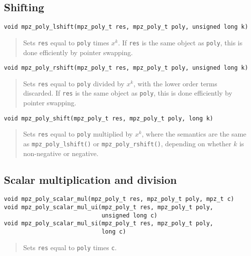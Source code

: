 \documentclass[a4paper,10pt]{article}
\newcommand{\code}{\lstinline}
\begin{document}
\subsection{Shifting}

\begin{lstlisting}
void mpz_poly_lshift(mpz_poly_t res, mpz_poly_t poly, unsigned long k)
\end{lstlisting}
\begin{quote}
Sets \code{res} equal to \code{poly} times $x^k$. If \code{res} is the same object as \code{poly}, this is done efficiently by pointer swapping.
\end{quote}

\begin{lstlisting}
void mpz_poly_rshift(mpz_poly_t res, mpz_poly_t poly, unsigned long k)
\end{lstlisting}
\begin{quote}
Sets \code{res} equal to \code{poly} divided by $x^k$, with the lower order terms discarded. If \code{res} is the same object as \code{poly}, this is done efficiently by pointer swapping.
\end{quote}

\begin{lstlisting}
void mpz_poly_shift(mpz_poly_t res, mpz_poly_t poly, long k)
\end{lstlisting}
\begin{quote}
Sets \code{res} equal to \code{poly} multiplied by $x^k$, where the semantics are the same as \code{mpz_poly_lshift()} or \code{mpz_poly_rshift()}, depending on whether $k$ is non-negative or negative.
\end{quote}


\subsection{Scalar multiplication and division}

\begin{lstlisting}
void mpz_poly_scalar_mul(mpz_poly_t res, mpz_poly_t poly, mpz_t c)
void mpz_poly_scalar_mul_ui(mpz_poly_t res, mpz_poly_t poly,
                            unsigned long c)
void mpz_poly_scalar_mul_si(mpz_poly_t res, mpz_poly_t poly,
                            long c)
\end{lstlisting}
\begin{quote}
Sets \code{res} equal to \code{poly} times \code{c}.
\end{quote}
\end{document}
